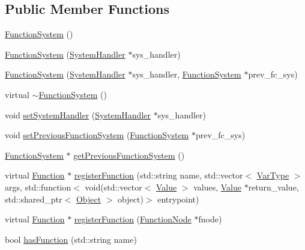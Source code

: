 \subsection*{Public Member Functions}
\begin{DoxyCompactItemize}
\item 
\hyperlink{classFunctionSystem_a66e3b5e5118f00a940c3e4a2f138c9c6}{Function\+System} ()
\item 
\hyperlink{classFunctionSystem_a8c2420b3c21af6e84bdf0ef23ccdb0a6}{Function\+System} (\hyperlink{classSystemHandler}{System\+Handler} $\ast$sys\+\_\+handler)
\item 
\hyperlink{classFunctionSystem_aa847d30455d0868179326505ec6384cd}{Function\+System} (\hyperlink{classSystemHandler}{System\+Handler} $\ast$sys\+\_\+handler, \hyperlink{classFunctionSystem}{Function\+System} $\ast$prev\+\_\+fc\+\_\+sys)
\item 
virtual \hyperlink{classFunctionSystem_ad6f794406996091d08df65e8d3e0e665}{$\sim$\+Function\+System} ()
\item 
void \hyperlink{classFunctionSystem_a7924e14b5794c595167aa9d547182883}{set\+System\+Handler} (\hyperlink{classSystemHandler}{System\+Handler} $\ast$sys\+\_\+handler)
\item 
void \hyperlink{classFunctionSystem_a2304a8ecdf5ddad124779b75be69f4a1}{set\+Previous\+Function\+System} (\hyperlink{classFunctionSystem}{Function\+System} $\ast$prev\+\_\+fc\+\_\+sys)
\item 
\hyperlink{classFunctionSystem}{Function\+System} $\ast$ \hyperlink{classFunctionSystem_a2c6914067d4eca5f9c039bed454d072f}{get\+Previous\+Function\+System} ()
\item 
virtual \hyperlink{classFunction}{Function} $\ast$ \hyperlink{classFunctionSystem_a37becc8c6067e6d7e4a1cc494e7d722f}{register\+Function} (std\+::string name, std\+::vector$<$ \hyperlink{classVarType}{Var\+Type} $>$ args, std\+::function$<$ void(std\+::vector$<$ \hyperlink{classValue}{Value} $>$ values, \hyperlink{classValue}{Value} $\ast$return\+\_\+value, std\+::shared\+\_\+ptr$<$ \hyperlink{classObject}{Object} $>$ object)$>$ entrypoint)
\item 
virtual \hyperlink{classFunction}{Function} $\ast$ \hyperlink{classFunctionSystem_a7356903aa11df3b4c52f7d0c8f230d87}{register\+Function} (\hyperlink{classFunctionNode}{Function\+Node} $\ast$fnode)
\item 
bool \hyperlink{classFunctionSystem_a7248f494dea505ffaa2108b202f1efcb}{has\+Function} (std\+::string name)
\item 

\end{DoxyCompactItemize}
